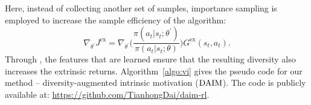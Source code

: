 Here, instead of collecting another set of samples, importance sampling is employed to increase the sample efficiency of the algorithm:
\begin{equation}
    \nabla_{\theta^{\prime}}J^{\text{ex}} =  \nabla_{\theta^{\prime}}\Bigg (\frac{\pi(a_{t}|s_{t};\theta^{\prime})}{\pi(a_{t}|s_{t};\theta)}\Bigg ) G^{\text{ex}}(s_{t}, a_{t}).
\label{eq:importance_sampling}
\end{equation}
Through , the features that are learned ensure that the resulting diversity also increases the extrinsic returns.  Algorithm~\ref{algo:vi} gives the pseudo code for our method -- diversity-augmented intrinsic motivation ($\text{DAIM}$). The code is publicly available at: \href{https://github.com/TianhongDai/daim-rl}{https://github.com/TianhongDai/daim-rl}.

